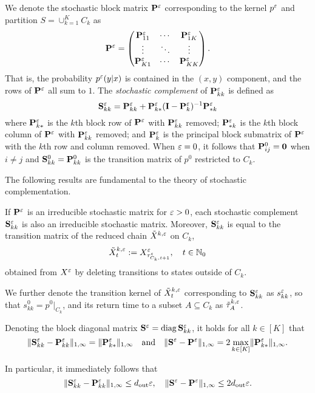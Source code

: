 We denote the stochastic block matrix $\mathbf{P}^\varepsilon$ corresponding to the kernel $p^\varepsilon$ and partition $S=\cup_{k=1}^K C_k$ as
\begin{align*}
\mathbf{P}^\varepsilon = \begin{pmatrix}
\mathbf{P}_{11}^\varepsilon &\cdots & \mathbf{P}_{1K}^\varepsilon\\
\vdots& \ddots &\vdots\\
\mathbf{P}_{K1}^\varepsilon &\cdots & \mathbf{P}_{KK}^\varepsilon
\end{pmatrix}.
\end{align*}
That is, the probability $p^\varepsilon(y|x)$ is contained in the $(x,y)$ component, and the rows of $\mathbf{P}^\varepsilon$ all sum to $1$. The \textit{stochastic complement} of $\mathbf{P}_{kk}^\varepsilon$ is defined as \citep{Meyer89}
\begin{equation*}
\mathbf{S}_{kk}^\varepsilon = \mathbf{P}_{kk}^\varepsilon + \mathbf{P}_{k*}^\varepsilon(\mathbf{I}-\mathbf{P}_k^\varepsilon)^{-1} \mathbf{P}_{*k}^\varepsilon
\end{equation*}
where $\mathbf{P}_{k*}^\varepsilon$ is the $k$th block row of $\mathbf{P}^\varepsilon$ with $\mathbf{P}_{kk}^\varepsilon$ removed; $\mathbf{P}_{*k}^\varepsilon$ is the $k$th block column of $\mathbf{P}^\varepsilon$ with $\mathbf{P}_{kk}^\varepsilon$ removed; and $\mathbf{P}_k^\varepsilon$ is the principal block submatrix of $\mathbf{P}^\varepsilon$ with the $k$th row and column removed. When $\varepsilon=0$, it follows that $\mathbf{P}_{ij}^0=\boldsymbol{0}$ when $i\neq j$ and $\mathbf{S}_{kk}^0 = \mathbf{P}_{kk}^0$ is the transition matrix of $p^0$ restricted to $C_k$.

The following results are fundamental to the theory of stochastic complementation.

\begin{thm}\label{thm:complement}
If $\mathbf{P}^\varepsilon$ is an irreducible stochastic matrix for $\varepsilon>0$, each stochastic complement $\mathbf{S}_{kk}^\varepsilon$ is also an irreducible stochastic matrix. Moreover, $\mathbf{S}_{kk}^\varepsilon$ is equal to the transition matrix of the reduced chain $\tilde{X}^{k,\varepsilon}$ on $C_k$,
\begin{equation}\label{eq:reduced}
\tilde{X}_t^{k,\varepsilon} := X_{\tau_{C_k,t+1}^\varepsilon}^\varepsilon, \quad t\in\mathbb{N}_0
\end{equation}
obtained from $X^\varepsilon$ by deleting transitions to states outside of $C_k$.
\end{thm}

We further denote the transition kernel of $\tilde{X}_t^{k,\varepsilon}$ corresponding to $\mathbf{S}_{kk}^\varepsilon$ as $s_{kk}^\varepsilon$, so that $s_{kk}^0 = p^0|_{C_k}$, and its return time to a subset $A\subseteq C_k$ as $\tilde{\tau}_A^{k,\varepsilon}$.

\begin{lemma}
Denoting the block diagonal matrix $\mathbf{S}^\varepsilon = \operatorname{diag} \mathbf{S}_{kk}^\varepsilon$, it holds for all $k\in[K]$ that
\begin{equation*}
\lVert\mathbf{S}_{kk}^\varepsilon - \mathbf{P}_{kk}^\varepsilon\rVert_{1,\infty} = \lVert\mathbf{P}_{k*}^\varepsilon\rVert_{1,\infty} \quad\text{and}\quad \lVert\mathbf{S}^\varepsilon - \mathbf{P}^\varepsilon\rVert_{1,\infty} = 2\max_{k\in[K]}\lVert\mathbf{P}_{k*}^\varepsilon\rVert_{1,\infty}.
\end{equation*}
\end{lemma}
In particular, it immediately follows that
\begin{equation}\label{eq:spbound}
\lVert\mathbf{S}_{kk}^\varepsilon - \mathbf{P}_{kk}^\varepsilon\rVert_{1,\infty} \le d_{\operatorname{out}}\varepsilon, \quad \lVert\mathbf{S}^\varepsilon - \mathbf{P}^\varepsilon\rVert_{1,\infty} \le 2d_{\operatorname{out}}\varepsilon.
\end{equation}


